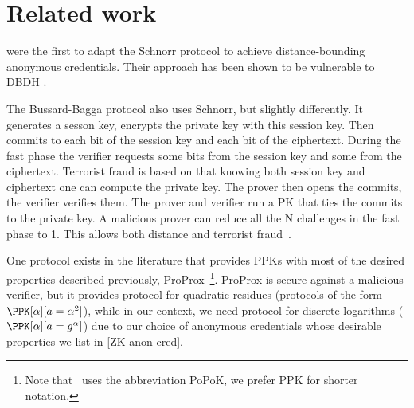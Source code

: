 \section{Related work}%
\label{related-work}


\textcite{DistanceBounding} were the first to adapt the Schnorr
protocol to achieve distance-bounding anonymous credentials. Their
approach has been shown to be vulnerable to \ac{DBDH} \cite{TamarinDB}.

  The Bussard-Bagga protocol also uses Schnorr, but slightly
  differently. It generates a sesson key, encrypts the private key
  with this session key. Then commits to each bit of the session key
  and each bit of the ciphertext. During the fast phase the verifier requests some bits from the session key and some from the ciphertext. Terrorist fraud is based on that knowing both session key and ciphertext one can compute the private key.
The prover then opens the commits, the verifier verifies them.
The prover and verifier run a PK that ties the commits to the private key.
A malicious prover can reduce all the N challenges in the fast phase
to 1. This allows both distance and terrorist
fraud~\cite{AttacksBussardBagga}.

One protocol exists in the literature that provides \acp{PPK} with most of the desired properties described previously, ProProx~\cite{ProProx}\footnote{Note that~\cite{ProProx} uses the abbreviation PoPoK, we prefer \acs{PPK} for shorter notation.}.
ProProx is secure against a malicious verifier, but it provides  protocol for quadratic residues (\ie protocols of the form \(\PPK[\alpha][a = 
  \alpha^2]\)), while in our context, we need  protocol for discrete logarithms (\ie \(\PPK[\alpha][a = g^\alpha]\)) due to our choice of anonymous credentials whose desirable properties we list in \cref{ZK-anon-cred}.%



